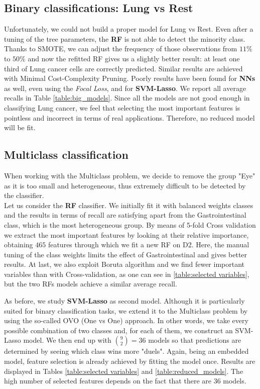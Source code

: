 \documentclass[a4paper,11pt, oneside]{article}  %
\begin{document}
\subsection{Binary classifications: Lung vs Rest}
Unfortunately,  we could not build a proper model for Lung vs Rest.  Even after a tuning of the tree parameters,  the \textbf{RF} is not able to detect the minority class.  Thanks to SMOTE, we can adjust the frequency of those observations from $11\%$ to $50\%$ and now the refitted RF gives us a slightly better result: at least one third of Lung cancer cells are correctly predicted.  Similar results are achieved with Minimal Cost-Complexity Pruning. Poorly results have been found for \textbf{NNs} as well,  even using the \textit{Focal Loss}, and for \textbf{SVM-Lasso}. We report all average recalls in Table \ref{table:big_models}.  Since all the models are not good enough in classifying Lung cancer, we feel that selecting the most important features is pointless and incorrect in terms of real applications. Therefore,  no reduced model will be fit.

\subsection{Multiclass classification}
When working with the Multiclass problem, we decide to remove the group "Eye" as it is too small and heterogeneous,  thus extremely difficult to be detected by the classifier.  \\

Let us consider the \textbf{RF}  classifier. We initially fit it with balanced weights classes and the results in terms of recall are satisfying apart from the Gastrointestinal class,  which is the most heterogeneous group. By means of 5-fold Cross validation we extract the most important features by looking at their relative importance,  obtaining $465$ features through which we fit a new RF on D2.  Here,  the manual tuning of the class weights limits the effect of Gastrointestinal and gives better results.  At last, we also exploit Boruta algorithm and we find fewer important variables than with Cross-validation,  as one can see in \ref{table:selected variables},  but the two RFs models achieve a similar average recall.

As before, we study \textbf{SVM-Lasso} as second model.  Although it is particularly suited for binary classification tasks, we extend it to the Multiclass problem by using the so-called OVO (One vs One) approach. In other words, we take every possible combination of two classes and, for each of them, we construct an SVM-Lasso model. We then end up with $ \binom{9}{2} = 36$ models so that predictions are determined by seeing which class wins more "duels". Again,  being an embedded model, feature selection is already achieved by fitting the model once.  Results are displayed in Tables \ref{table:selected variables} and \ref{table:reduced_models}. The high number of selected features depends on the fact that there are 36 models.  
\end{document}
